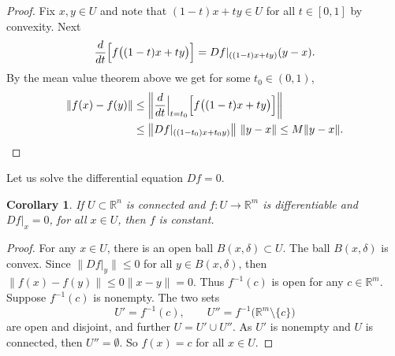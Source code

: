 \documentclass[12pt,openany]{book}
\newcommand{\snorm}[1]{\lVert {#1} \rVert}
\newcommand{\norm}[1]{\left\lVert {#1} \right\rVert}
\newcommand{\R}{{\mathbb{R}}}
\theoremstyle{plain}
\newtheorem{cor}[thm]{Corollary}
\theoremstyle{remark}
\theoremstyle{definition}
\theoremstyle{exercise}
\theoremstyle{example}
\begin{document}
\begin{proof}
Fix $x,y \in U$ and note that
$(1-t)x+ty \in U$ for all $t \in [0,1]$
by convexity.
Next
\begin{equation*}
\frac{d}{dt} \Bigl[f\bigl((1-t)x+ty\bigr)\Bigr]
=
Df|_{((1-t)x+ty)} (y-x) .
\end{equation*}
By the mean value theorem above we get for
some $t_0 \in (0,1)$,
\begin{equation*}
\begin{split}
\snorm{f(x)-f(y)} & \leq
\norm{\frac{d}{dt} \Big|_{t=t_0} \Bigl[ f\bigl((1-t)x+ty\bigr) \Bigr] }
\\
& \leq
\norm{Df|_{((1-t_0)x+t_0y)}} \, \snorm{y-x} \leq
M \snorm{y-x} . \qedhere
\end{split}
\end{equation*}
\end{proof}

Let us solve the differential equation $Df = 0$.

\begin{cor} \label{thm:svzerodersol}
If $U \subset \R^n$ is connected and $f \colon U \to \R^m$ is differentiable
and $Df|_x = 0$, for all $x \in U$, then $f$ is constant.
\end{cor}

\begin{proof}
For any $x \in U$, there is an open ball $B(x,\delta) \subset U$.  The ball
$B(x,\delta)$ is convex.  Since
$\snorm{Df|_y} \leq 0$ for all $y \in B(x,\delta)$, then
$\snorm{f(x)-f(y)} \leq 0 \snorm{x-y} = 0$.
Thus $f^{-1}(c)$ is open for any $c \in \R^m$.  Suppose
$f^{-1}(c)$ is nonempty.  
The two sets
\begin{equation*}
U' = f^{-1}(c), \qquad U'' = f^{-1}\bigl(\R^m\setminus\{c\}\bigr)
\end{equation*}
are open and disjoint, and further $U = U' \cup U''$.  As $U'$ is nonempty
and $U$ is connected, then $U'' = \emptyset$.  So $f(x) = c$ for all $x \in U$.
\end{proof}
\end{document}
